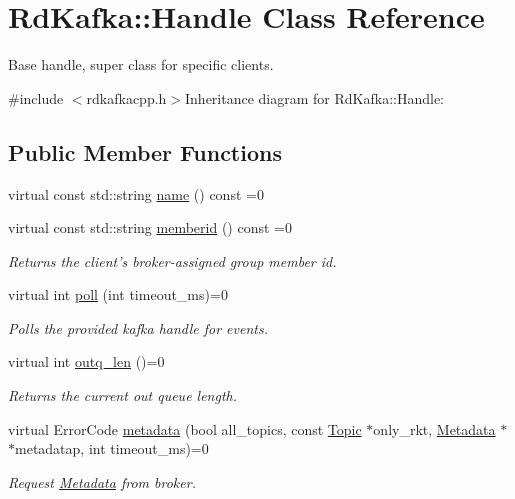 \hypertarget{classRdKafka_1_1Handle}{
\section{RdKafka::Handle Class Reference}
\label{classRdKafka_1_1Handle}
}


Base handle, super class for specific clients.  


{\ttfamily \#include $<$rdkafkacpp.h$>$}Inheritance diagram for RdKafka::Handle:\subsection*{Public Member Functions}
\begin{DoxyCompactItemize}
\item 
virtual const std::string \hyperlink{classRdKafka_1_1Handle_abaa74be1b5b15784d47bc9c97edd0b9c}{name} () const =0
\item 
virtual const std::string \hyperlink{classRdKafka_1_1Handle_ae0395b131921c05554688202fc0160a4}{memberid} () const =0
\begin{DoxyCompactList}\small\item\em Returns the client's broker-\/assigned group member id. \item\end{DoxyCompactList}\item 
virtual int \hyperlink{classRdKafka_1_1Handle_a98d3b4ee48457ff13e4d5155e3fc5ea4}{poll} (int timeout\_\-ms)=0
\begin{DoxyCompactList}\small\item\em Polls the provided kafka handle for events. \item\end{DoxyCompactList}\item 
virtual int \hyperlink{classRdKafka_1_1Handle_a5ea17c83faa627056fca792be4ec6616}{outq\_\-len} ()=0
\begin{DoxyCompactList}\small\item\em Returns the current out queue length. \item\end{DoxyCompactList}\item 
virtual ErrorCode \hyperlink{classRdKafka_1_1Handle_ac0cc63c574ce027a184640645151a75c}{metadata} (bool all\_\-topics, const \hyperlink{classRdKafka_1_1Topic}{Topic} $\ast$only\_\-rkt, \hyperlink{classRdKafka_1_1Metadata}{Metadata} $\ast$$\ast$metadatap, int timeout\_\-ms)=0
\begin{DoxyCompactList}\small\item\em Request \hyperlink{classRdKafka_1_1Metadata}{Metadata} from broker. \item\end{DoxyCompactList}\item 
$$
\end{DoxyCompactItemize}
